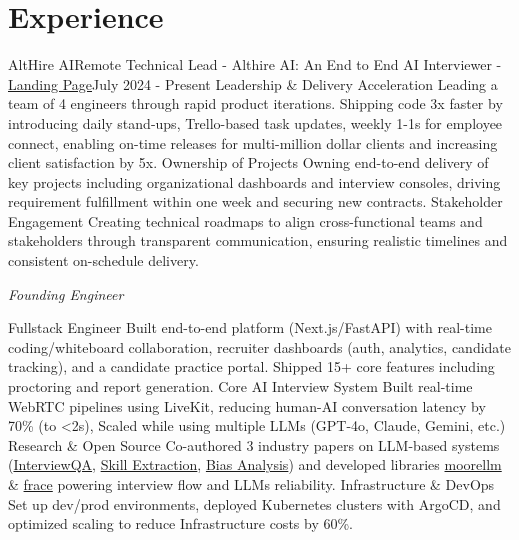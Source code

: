 \section{Experience}
\resumeSubHeadingListStart


\resumeSubheading
{AltHire AI}{Remote}
{Technical Lead - Althire AI: An End to End AI Interviewer - \href{https://althire.ai}{Landing Page}}{July 2024 - Present}
\resumeItemListStart
\resumeItem
{Leadership \& Delivery Acceleration}
{Leading a team of 4 engineers through rapid product iterations. Shipping code 3x faster by introducing daily stand-ups, Trello-based task updates, weekly 1-1s for employee connect, enabling on-time releases for multi-million dollar clients and increasing client satisfaction by 5x.}
\resumeItem
{Ownership of Projects}
{Owning end-to-end delivery of key projects including organizational dashboards and interview consoles, driving requirement fulfillment within one week and securing new contracts.}
\resumeItem
{Stakeholder Engagement}
{Creating technical roadmaps to align cross-functional teams and stakeholders through transparent communication, ensuring realistic timelines and consistent on-schedule delivery.}
\resumeItemListEnd

\textit{\small Founding Engineer}
\vspace{-5pt}

\resumeItemListStart
\resumeItem
{Fullstack Engineer}
{Built end-to-end platform (Next.js/FastAPI) with real-time coding/whiteboard collaboration, recruiter dashboards (auth, analytics, candidate tracking), and a candidate practice portal. Shipped 15+ core features including proctoring and report generation.}
\resumeItem
{Core AI Interview System}
{Built real-time WebRTC pipelines using LiveKit, reducing human-AI conversation latency by 70\% (to \textless 2s), Scaled while using multiple LLMs (GPT-4o, Claude, Gemini, etc.)}
\resumeItem
{Research \& Open Source}
{Co-authored 3 industry papers on LLM-based systems (\href{https://arxiv.org/abs/2504.00310}{InterviewQA}, \href{https://arxiv.org/abs/2503.13499}{Skill Extraction}, \href{https://arxiv.org/abs/2503.07993}{Bias Analysis}) and developed libraries \href{https://github.com/searchX/moorellm}{moorellm} \& \href{https://github.com/searchX/frace}{frace} powering interview flow and LLMs reliability.}
\resumeItem
{Infrastructure \& DevOps}
{Set up dev/prod environments, deployed Kubernetes clusters with ArgoCD, and optimized scaling to reduce Infrastructure costs by 60\%.}

